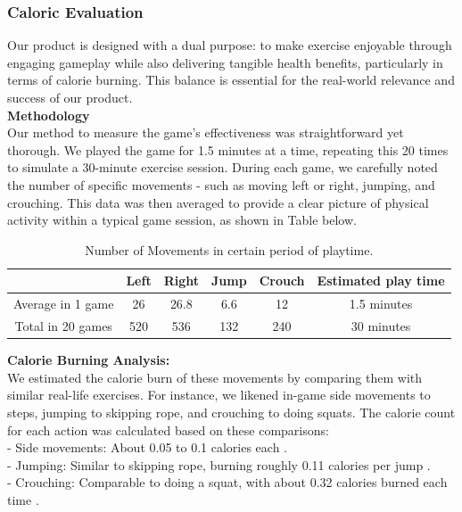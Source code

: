 \documentclass[12pt]{article}
\begin{document}
\subsubsection{Caloric Evaluation}

Our product is designed with a dual purpose: to make exercise enjoyable through engaging gameplay while also delivering tangible health benefits, particularly in terms of calorie burning. This balance is essential for the real-world relevance and success of our product.\\

\textbf{Methodology}\\
Our method to measure the game's effectiveness was straightforward yet thorough. We played the game for 1.5 minutes at a time, repeating this 20 times to simulate a 30-minute exercise session. During each game, we carefully noted the number of specific movements - such as moving left or right, jumping, and crouching. This data was then averaged to provide a clear picture of physical activity within a typical game session, as shown in Table below.

\begin{table}[h]
    \centering
    \caption{Number of Movements in certain period of playtime.}
    \begin{tabular}{|c|c|c|c|c|c|}
        \hline
                          & Left & Right & Jump & Crouch & Estimated play time \\
        \hline
        Average in 1 game & 26   & 26.8  & 6.6  & 12     & 1.5 minutes         \\
        \hline
        Total in 20 games & 520  & 536   & 132  & 240    & 30 minutes          \\
        \hline
    \end{tabular}
\end{table}

\textbf{Calorie Burning Analysis:}\\
We estimated the calorie burn of these movements by comparing them with similar real-life exercises. For instance, we likened in-game side movements to steps, jumping to skipping rope, and crouching to doing squats. The calorie count for each action was calculated based on these comparisons:\\[5pt]
- Side movements: About 0.05 to 0.1 calories each \cite{baum2018}.\\
- Jumping: Similar to skipping rope, burning roughly 0.11 calories per jump \cite{frey2015}.\\
- Crouching: Comparable to doing a squat, with about 0.32 calories burned each time \cite{english2022}.\\
\end{document}
